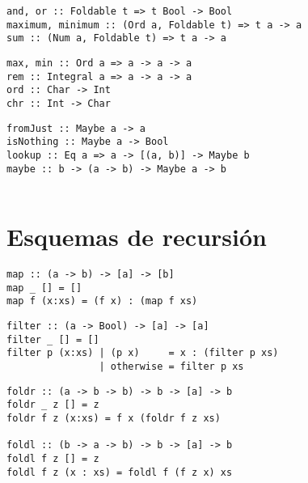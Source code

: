 \documentclass[10pt,a4paper]{article}
\begin{document}
\begin{centrado}
	\begin{verbatim}
and, or :: Foldable t => t Bool -> Bool
maximum, minimum :: (Ord a, Foldable t) => t a -> a
sum :: (Num a, Foldable t) => t a -> a
	\end{verbatim}
\end{centrado} 
\begin{centrado}
	\begin{verbatim}
max, min :: Ord a => a -> a -> a
rem :: Integral a => a -> a -> a
ord :: Char -> Int
chr :: Int -> Char
	\end{verbatim}
\end{centrado} 
\begin{centrado}
	\begin{verbatim}
fromJust :: Maybe a -> a
isNothing :: Maybe a -> Bool
lookup :: Eq a => a -> [(a, b)] -> Maybe b
maybe :: b -> (a -> b) -> Maybe a -> b


	\end{verbatim}
\end{centrado} 

\newpage
\section{Esquemas de recursión}

\begin{centrado}
	\begin{verbatim}
map :: (a -> b) -> [a] -> [b]
map _ [] = []
map f (x:xs) = (f x) : (map f xs)
	\end{verbatim}
\end{centrado} 

\begin{centrado}
	\begin{verbatim}
filter :: (a -> Bool) -> [a] -> [a]
filter _ [] = []
filter p (x:xs) | (p x)     = x : (filter p xs)
                | otherwise = filter p xs  
	\end{verbatim}
\end{centrado}

\begin{centrado}
	\begin{verbatim}
foldr :: (a -> b -> b) -> b -> [a] -> b
foldr _ z [] = z
foldr f z (x:xs) = f x (foldr f z xs)
		
foldl :: (b -> a -> b) -> b -> [a] -> b
foldl f z [] = z
foldl f z (x : xs) = foldl f (f z x) xs
\end{verbatim}
\end{centrado}
\end{document}

